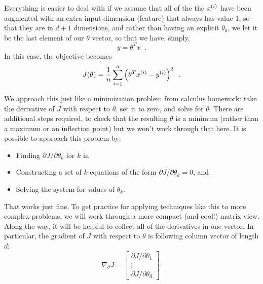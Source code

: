 Everything is easier to deal with if we assume that all of the the $x^{(i)}$
have been augmented with an extra input dimension (feature) that
always has value 1, so that they are in $d+1$ dimensions, and rather
than having an explicit $\theta_0$, we let it be the last element of
our $\theta$ vector, so that we have, simply,
\[y = \theta^T x\;\;.\]
In this case, the objective becomes
\begin{equation}
  J(\theta) = \frac{1}{n}\sum_{i =
    1}^n\left(\theta^Tx^{(i)} - y^{(i)}\right)^2 \;\;.
  \label{eq:reg_mse}
\end{equation}


We approach this just like a minimization problem from calculus
homework:  take the derivative of $J$ with respect to $\theta$, set it
to zero, and solve for $\theta$.  There are additional steps
required, to check that the resulting $\theta$ is a minimum (rather
than a maximum or an inflection point) but we won't work through that
here.   It is possible to approach this problem by:
\begin{itemize}
  \item Finding $\partial{J}/\partial{\theta_k}$ for $k$ in
  \item Constructing a set of $k$ equations of the form
        $\partial{J}/\partial{\theta_k} = 0$, and
  \item Solving the system for values of $\theta_k$.
\end{itemize}
That works just fine.  To get practice for applying techniques like
this to more complex problems, we will work through a more compact
(and cool!) matrix view. Along the way, it will be helpful to collect all of the derivatives in one
vector. In particular,
the
gradient of $J$ with respect to $\theta$ is following column vector of length $d$:
\[
  \nabla_\theta J =
  \begin{bmatrix}
    \partial J / \partial \theta_1 \\
    \vdots                         \\
    \partial J / \partial \theta_d
  \end{bmatrix}.
\]


